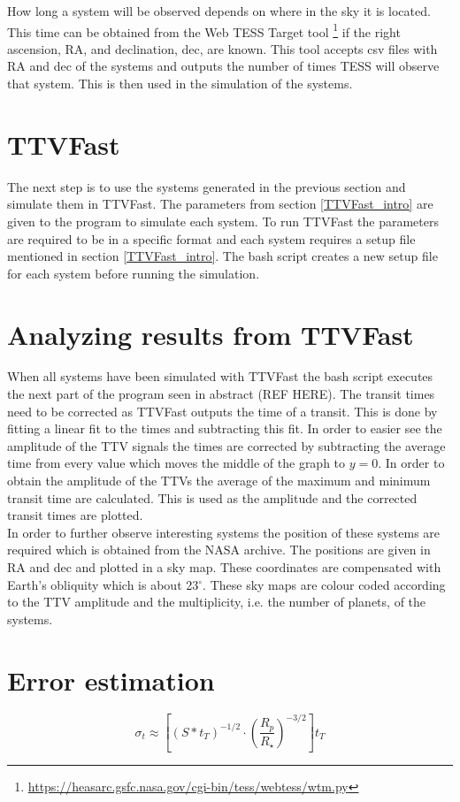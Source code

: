 \documentclass[12pt]{report}
\begin{document}
	How long a system will be observed depends on where in the sky it is located. This time can be obtained from the Web TESS Target tool \footnote{\url{https://heasarc.gsfc.nasa.gov/cgi-bin/tess/webtess/wtm.py}} if the right ascension, RA, and declination, dec, are known. This tool accepts csv files with RA and dec of the systems and outputs the number of times TESS will observe that system. This is then used in the simulation of the systems.
	

\section{TTVFast}
\label{TTVFast_method}
	The next step is to use the systems generated in the previous section and simulate them in TTVFast. The parameters from section \ref{TTVFast_intro} are given to the program to simulate each system. To run TTVFast the parameters are required to be in a specific format and each system requires a setup file mentioned in section \ref{TTVFast_intro}. The bash script creates a new setup file for each system before running the simulation. 

\section{Analyzing results from TTVFast}
	When all systems have been simulated with TTVFast the bash script executes the next part of the program seen in abstract (REF HERE). The transit times need to be corrected as TTVFast outputs the time of a transit. This is done by fitting a linear fit to the times and subtracting this fit. In order to easier see the amplitude of the TTV signals the times are corrected by subtracting the average time from every value which moves the middle of the graph to $y=0$. In order to obtain the amplitude of the TTVs the average of the maximum and minimum transit time are calculated. This is used as the amplitude and the corrected transit times are plotted. \\
	
	In order to further observe interesting systems the position of these systems are required which is obtained from the NASA archive. The positions are given in RA and dec and plotted in a sky map. These coordinates are compensated with Earth's obliquity which is about 23$^{\circ}$. These sky maps are colour coded according to the TTV amplitude and the multiplicity, i.e. the number of planets, of the systems.
\section{Error estimation}
\cite{2005Sci...307.1288H}
	\begin{equation}
		\sigma_t \approx \left[\left(S * t_T\right)^{-1/2} \cdot \left(\frac{R_p}{R_{\star}}\right)^{-3/2}\right] t_T
	\end{equation}
\end{document}
